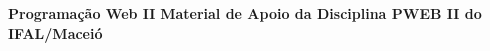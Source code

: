 

\thispagestyle{empty}


\vspace*{\fill}

\begin{center}
\textbf{\color{verde_UnB}\fontsize{36pt}{45.6pt}\selectfont \textbf{Programação Web II}}
\textbf{\color{cinza_UnB}\fontsize{24pt}{28.6pt}\selectfont \textbf{Material de Apoio da Disciplina PWEB II do IFAL/Maceió}}

\end{center}

\vfill

\vspace*{\fill}

\clearpage